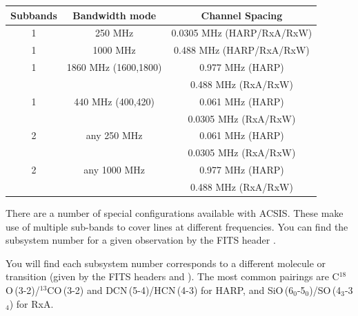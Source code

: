 \documentclass[11pt,oneside,chapters]{starlink}
\begin{document}
\newpage
\begin{table}[h!]
\begin{center}
\begin{tabular}{c|c|c}
\hline
\textbf{Subbands} & \textbf{Bandwidth mode}  & \textbf{Channel Spacing}\\
\hline
1 & 250 MHz & 0.0305 MHz (HARP/RxA/RxW)\\
1 &1000 MHz & 0.488 MHz (HARP/RxA/RxW)\\
1 &1860 MHz (1600,1800) & 0.977 MHz (HARP) \\
  &         & 0.488 MHz (RxA/RxW)\\
1 & 440 MHz (400,420) & 0.061 MHz (HARP) \\
  &         & 0.0305 MHz (RxA/RxW)\\
\hline
2 & any 250 MHz      & 0.061 MHz (HARP)\\
  &         & 0.0305 MHz (RxA/RxW)\\
2 &any 1000 MHz & 0.977 MHz (HARP) \\
  &         & 0.488 MHz (RxA/RxW)\\
\hline
\end{tabular}
\label{fig:backend}
\end{center}
\end{table}
There are a number of special configurations available with ACSIS.
These make use of multiple sub-bands to cover lines at different
frequencies.  You can find the subsystem number for a given
observation by the FITS header .

You will find each subsystem number corresponds to a different
molecule or transition (given by the FITS headers  and
). The most common pairings are
C$^{18}$O\,(3-2)/$^{13}$CO\,(3-2) and DCN\,(5-4)/HCN\,(4-3) for HARP,
and SiO\,(6$_0$-5$_0$)/SO\,(4$_3$-3$_4$) for RxA.
\end{document}

